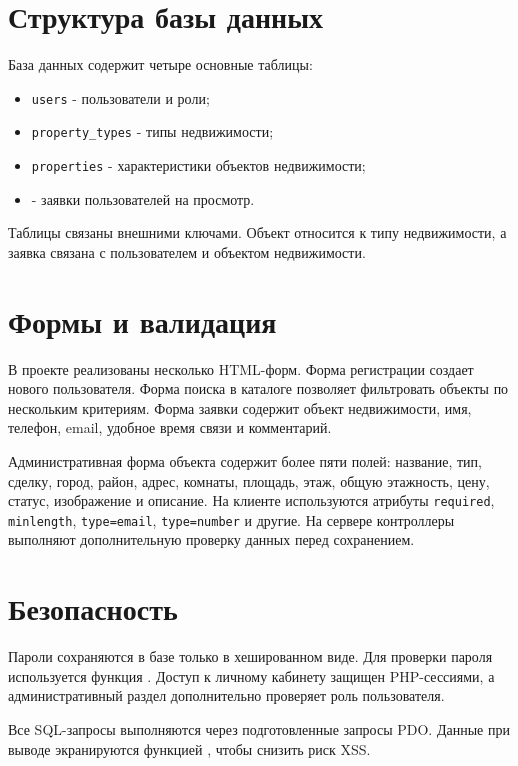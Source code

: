 \documentclass[12pt,a4paper]{article}
\begin{document}
\section{Структура базы данных}

База данных содержит четыре основные таблицы:
\begin{itemize}
  \item \texttt{users} - пользователи и роли;
  \item \texttt{property\_types} - типы недвижимости;
  \item \texttt{properties} - характеристики объектов недвижимости;
  \item {} - заявки пользователей на просмотр.
\end{itemize}

Таблицы связаны внешними ключами. Объект относится к типу недвижимости, а заявка связана с пользователем и объектом недвижимости.

\section{Формы и валидация}

В проекте реализованы несколько HTML-форм. Форма регистрации создает нового пользователя. Форма поиска в каталоге позволяет фильтровать объекты по нескольким критериям. Форма заявки содержит объект недвижимости, имя, телефон, email, удобное время связи и комментарий.

Административная форма объекта содержит более пяти полей: название, тип, сделку, город, район, адрес, комнаты, площадь, этаж, общую этажность, цену, статус, изображение и описание. На клиенте используются атрибуты \texttt{required}, \texttt{minlength}, \texttt{type=email}, \texttt{type=number} и другие. На сервере контроллеры выполняют дополнительную проверку данных перед сохранением.

\section{Безопасность}

Пароли сохраняются в базе только в хешированном виде. Для проверки пароля используется функция . Доступ к личному кабинету защищен PHP-сессиями, а административный раздел дополнительно проверяет роль пользователя.

Все SQL-запросы выполняются через подготовленные запросы PDO. Данные при выводе экранируются функцией , чтобы снизить риск XSS.
\end{document}
